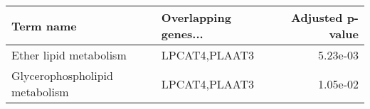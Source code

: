\begin{tabular}{llr}
\toprule
                     Term name & Overlapping genes... &  Adjusted p-value \\
\midrule
        Ether lipid metabolism &        LPCAT4,PLAAT3 &          5.23e-03 \\
Glycerophospholipid metabolism &        LPCAT4,PLAAT3 &          1.05e-02 \\
\bottomrule
\end{tabular}
